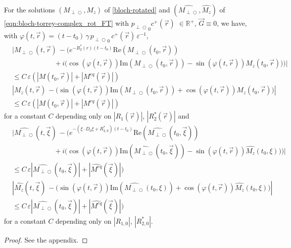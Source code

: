 \documentclass{ws-m3as}
\newcommand{\kspace}[1]{{#1}}
\renewcommand\Re{\mathrm{Re}}
\renewcommand\Im{\mathrm{Im}}
\def\Mpp{M_{\perp\!\!\!\!\!\bigcirc}}
\def\Mphp{\widehat{\Mpp}}
\def\pp{p_{\perp\!\!\!\!\!\bigcirc}}
\newcommand\taup{\varepsilon}
\newcommand{\revisionown}[1]{{ #1}}
\newcommand{\Margin}[1]{}
\begin{document}
\begin{lemma}\label{lem_rect}
For the solutions $(\Mpp,M_z)$ of 
\eqref{bloch-rotated} 
and $(\Mphp,\widehat{M_z})$ of 
\eqref{eqn:bloch-torrey-complex_rot_FT}
with ${\pp}_0 c^+(\vec r)$ $\in \mathbb{R}^+$, $\vec G\equiv 0$, we have, with 
\revisionown{$\varphi(t,\vec r)=(t-t_0)\,\gamma\,{\pp}_0\,c^+(\vec r)\,\taup^{-1}$,} 
\[
\begin{aligned}
&|\Mpp(t,\vec r)\,-\bigl(e^{-R_2^*(r)(t-t_0)}\Re(\Mpp(t_0,\vec r))\\
&\qquad\qquad\qquad+i\bigl(\cos(\varphi(t,\vec r))\Im(\Mpp(t_0,\vec r))-\sin(\varphi(t,\vec r))M_z(t_0,\vec r)\bigr)\bigr)|
\\&\leq C\,\taup(|M(t_0,\vec r)|+ |M^{eq}(\vec r)|)
\\[1ex]
&|M_z(t,\vec r)\,-\bigl(\sin(\varphi(t,\vec r))\Im(\Mpp(t_0,\vec r))+\cos(\varphi(t,\vec r))M_z(t_0,\vec r)\bigr)|
\\&\leq C\,\taup(|M(t_0,\vec r)|+ |M^{eq}(\vec r)|)
\end{aligned}
\]
for a constant $C$ depending only on $|R_1(\vec r)|$, $|R_2^*(\vec r)|$
\kspace{ and
\[
\begin{aligned}
&|\Mphp(t,\vec\xi)\, -\bigl(e^{-(\xi\cdot D_0\xi+R_{2,0}^*)(t-t_0)}\Re(\Mphp(t_0,\vec\xi))\\
&\qquad\qquad\qquad+i\bigl(\cos(\varphi(t,\vec r))\Im(\Mphp(t_0,\vec\xi))-\sin(\varphi(t,\vec r))\widehat{M_z}(t_0,\xi)\bigr)\bigr)|
\\&\leq C\,\taup|\Mphp(t_0,\vec\xi)|+ |\widehat{M^{eq}}(\vec\xi)|)
\\[1ex]
&|\widehat{M_z}(t,\vec\xi)\,-\bigl(\sin(\varphi(t,\vec r))\Im(\Mphp(t_0,\xi))+\cos(\varphi(t,\vec r))\widehat{M_z}(t_0,\xi)\bigr)|
\\&\leq C\,\taup|\Mphp(t_0,\vec\xi)|+ |\widehat{M^{eq}}(\vec\xi)|)
\end{aligned}
\]
for a constant $C$ depending only on $|R_{1,0}|$, $|R_{2,0}^*|$.
}
\end{lemma}
\begin{proof}
See the appendix. 
\end{proof}
\Margin{R1 C.}
\Margin{R2 (3)}
\end{document}
